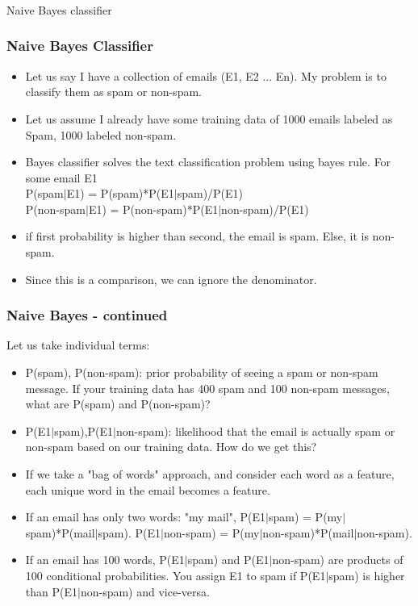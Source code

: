 \documentclass{beamer}
\begin{document}
\begin{frame}
\frametitle{}
\Large Naive Bayes classifier
\end{frame}

\begin{frame}
\frametitle{Naive Bayes Classifier}
\begin{itemize}
\item Let us say I have a collection of emails (E1, E2 ... En). My problem is to classify them as spam or non-spam.
\item Let us assume I already have some training data of 1000 emails labeled as Spam, 1000 labeled non-spam.
\item Bayes classifier solves the text classification problem using bayes rule. For some email E1\\
P(spam$|$E1) = P(spam)*P(E1$|$spam)/P(E1) \\
P(non-spam$|$E1) = P(non-spam)*P(E1$|$non-spam)/P(E1) 
\item if first probability is higher than second, the email is spam. Else, it is non-spam.
\item Since this is a comparison, we can ignore the denominator.
\end{itemize}
\end{frame}

\begin{frame}
\frametitle{Naive Bayes - continued}
Let us take individual terms:
\begin{itemize}
\item P(spam), P(non-spam): prior probability of seeing a spam or non-spam message. If your training data has 400 spam and 100 non-spam messages, what are P(spam) and P(non-spam)? \pause
\item P(E1$|$spam),P(E1$|$non-spam): likelihood that the email is actually spam or non-spam based on our training data. How do we get this?
\item If we take a "bag of words" approach, and consider each word as a feature, each unique word in the email becomes a feature. 
\item If an email has only two words: "my mail", P(E1$|$spam) = P(my$|$spam)*P(mail$|$spam). P(E1$|$non-spam) = P(my$|$non-spam)*P(mail$|$non-spam). \pause
\item If an email has 100 words, P(E1$|$spam) and P(E1$|$non-spam) are products of 100 conditional probabilities. You assign E1 to spam if P(E1$|$spam) is higher than P(E1$|$non-spam) and vice-versa.
\end{itemize}
\end{frame}
\end{document}
